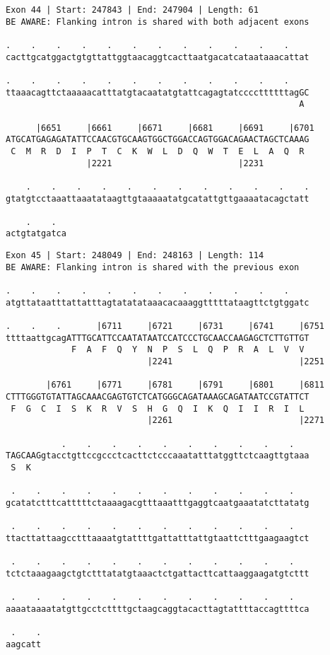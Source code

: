 \documentclass{article}
\begin{document}
\begin{Verbatim}[fontfamily=courier]
Exon 44 | Start: 247843 | End: 247904 | Length: 61
BE AWARE: Flanking intron is shared with both adjacent exons

.    .    .    .    .    .    .    .    .    .    .    .    
cacttgcatggactgtgttattggtaacaggtcacttaatgacatcataataaacattat

.    .    .    .    .    .    .    .    .    .    .    .    
ttaaacagttctaaaaacatttatgtacaatatgtattcagagtatccccttttttagGC
                                                          A 

      |6651     |6661     |6671     |6681     |6691     |6701
ATGCATGAGAGATATTCCAACGTGCAAGTGGCTGGACCAGTGGACAGAACTAGCTCAAAG
 C  M  R  D  I  P  T  C  K  W  L  D  Q  W  T  E  L  A  Q  R 
                |2221                         |2231         

    .    .    .    .    .    .    .    .    .    .    .    .
gtatgtcctaaattaaatataagttgtaaaaatatgcatattgttgaaaatacagctatt

    .    .  
actgtatgatca
\end{Verbatim}
\newpage
\begin{Verbatim}[fontfamily=courier]
Exon 45 | Start: 248049 | End: 248163 | Length: 114
BE AWARE: Flanking intron is shared with the previous exon

.    .    .    .    .    .    .    .    .    .    .    .    
atgttataatttattatttagtatatataaacacaaaggtttttataagttctgtggatc

.    .    .       |6711     |6721     |6731     |6741     |6751
ttttaattgcagATTTGCATTCCAATATAATCCATCCCTGCAACCAAGAGCTCTTGTTGT
             F  A  F  Q  Y  N  P  S  L  Q  P  R  A  L  V  V 
                            |2241                         |2251

        |6761     |6771     |6781     |6791     |6801     |6811
CTTTGGGTGTATTAGCAAACGAGTGTCTCATGGGCAGATAAAGCAGATAATCCGTATTCT
 F  G  C  I  S  K  R  V  S  H  G  Q  I  K  Q  I  I  R  I  L 
                            |2261                         |2271

           .    .    .    .    .    .    .    .    .    .   
TAGCAAGgtacctgttccgccctcacttctcccaaatatttatggttctcaagttgtaaa
 S  K                                                       

 .    .    .    .    .    .    .    .    .    .    .    .   
gcatatctttcatttttctaaaagacgtttaaatttgaggtcaatgaaatatcttatatg

 .    .    .    .    .    .    .    .    .    .    .    .   
ttacttattaagcctttaaaatgtattttgattatttattgtaattctttgaagaagtct

 .    .    .    .    .    .    .    .    .    .    .    .   
tctctaaagaagctgtctttatatgtaaactctgattacttcattaaggaagatgtcttt

 .    .    .    .    .    .    .    .    .    .    .    .   
aaaataaaatatgttgcctcttttgctaagcaggtacacttagtattttaccagttttca

 .    .
aagcatt
\end{Verbatim}
\end{document}

